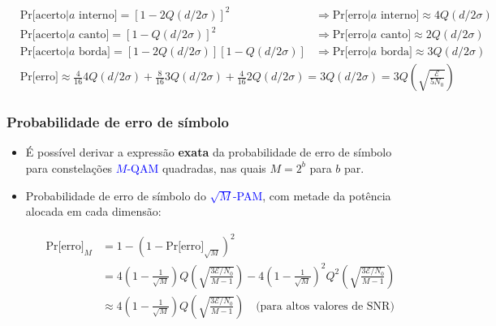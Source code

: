 \begin{frame}
\begin{itemize}
	\end{itemize}	
	\begin{footnotesize}
	\begin{align*}
		&\text{Pr[acerto}|a \text{ interno}] = [1 - 2Q(d/2\sigma)]^2 &\Rightarrow \text{Pr[erro}|a \text{ interno}] \approx 4Q(d/2\sigma) \\
		&\text{Pr[acerto}|a \text{ canto}] = [1 - Q(d/2\sigma)]^2 &\Rightarrow \text{Pr[erro}|a \text{ canto}] \approx 2Q(d/2\sigma) \\
		&\text{Pr[acerto}|a \text{ borda}] = [1 - 2Q(d/2\sigma)][1 - Q(d/2\sigma)] &\Rightarrow \text{Pr[erro}|a \text{ borda}] \approx 3Q(d/2\sigma)
	\end{align*}
	\begin{align*}
		&\text{Pr[erro]} \approx \frac{4}{16}  4Q(d/2\sigma) + \frac{8}{16} 3Q(d/2\sigma) + \frac{4}{16} 2Q(d/2\sigma) = 3Q(d/2\sigma) = 3Q\left(\sqrt{\frac{\mathcal{E}}{5N_0}} \right)
	\end{align*}
	\end{footnotesize}	    
\end{frame}

\begin{frame}
	\frametitle{Probabilidade de erro de símbolo}

	\begin{itemize}
	    \item É possível derivar a expressão \textbf{exata} da probabilidade de erro de símbolo para constelações \textcolor{blue}{$M$-QAM} quadradas, nas quais $M=2^b$ para $b$ par.
	    \item Probabilidade de erro de símbolo do \textcolor{blue}{$\sqrt{M}$-PAM}, com metade da potência alocada em cada dimensão:
	    \begin{small}
	    \begin{align*}
		\text{Pr[erro]}_M &= 1 - (1-\text{Pr[erro]}_{\sqrt{M}})^2 \\
		&= 4\left(1 - \frac{1}{\sqrt{M}} \right) Q\left(\sqrt{\frac{3\mathcal{E}/N_0}{M-1}} \right) - 4\left(1 - \frac{1}{\sqrt{M}} \right)^2 Q^2\left(\sqrt{\frac{3\mathcal{E}/N_0}{M-1}} \right) \\
		&\approx 4\left(1 - \frac{1}{\sqrt{M}} \right) Q\left(\sqrt{\frac{3\mathcal{E}/N_0}{M-1}} \right) \quad \text{(para altos valores de SNR)}
	    \end{align*}
	    \end{small}
	\end{itemize}		
\end{frame}

